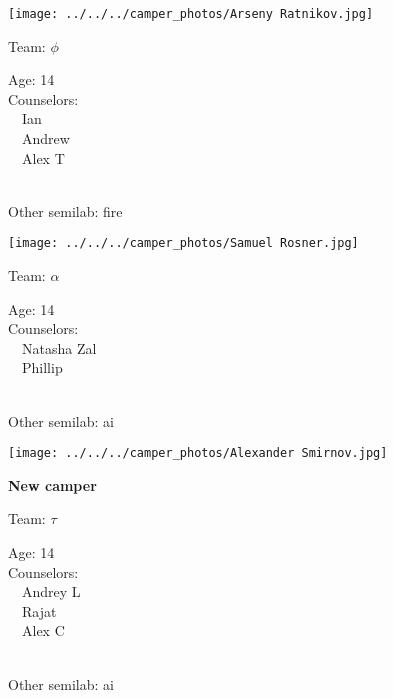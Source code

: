 \documentclass[10pt,letterpaper, landscape]{article}
\begin{document}
\horizontalshiftfornextsticker
\renewcommand{\baselinestretch}{1} \begin{sticker}
\noindent\begin{minipage}{0.5\textwidth}\texttt{[image: ../../../camper\_photos/Arseny Ratnikov.jpg]}\end{minipage}\begin{minipage}{0.45\textwidth}
Team: {\Large $\phi$}

Age:        14\\
Counselors: \\\ \ Ian\\\ \ Andrew\\\ \ Alex T\\
\end{minipage} \\ \vspace{0.07in}
Other semilab: fire
\end{sticker}
\horizontalshiftfornextsticker
\renewcommand{\baselinestretch}{1} \begin{sticker}
\noindent\begin{minipage}{0.5\textwidth}\texttt{[image: ../../../camper\_photos/Samuel Rosner.jpg]}\end{minipage}\begin{minipage}{0.45\textwidth}
Team: {\Large $\alpha$}

Age:        14\\
Counselors: \\\ \ Natasha Zal\\\ \ Phillip\\
\end{minipage} \\ \vspace{0.07in}
Other semilab: ai
\end{sticker}
\horizontalshiftfornextsticker
\renewcommand{\baselinestretch}{1} \begin{sticker}
\noindent\begin{minipage}{0.5\textwidth}\texttt{[image: ../../../camper\_photos/Alexander Smirnov.jpg]}\end{minipage}\begin{minipage}{0.45\textwidth}
\textbf{New camper} 

Team: {\Large $\tau$}

Age:        14\\
Counselors: \\\ \ Andrey L\\\ \ Rajat\\\ \ Alex C\\
\end{minipage} \\ \vspace{0.07in}
Other semilab: ai
\end{sticker}
\end{document}
